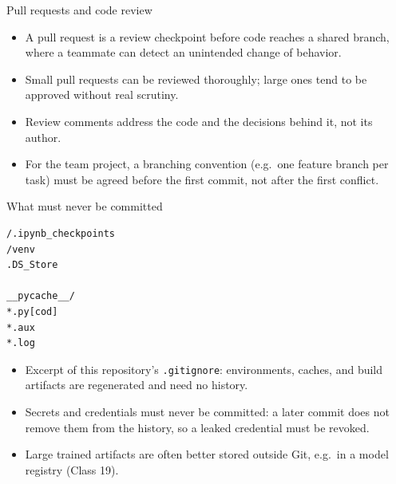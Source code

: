 \begin{frame}{Pull requests and code review}
\begin{itemize}
\item A pull request is a review checkpoint before code reaches a shared branch, where a teammate can detect an unintended change of behavior.
\item Small pull requests can be reviewed thoroughly; large ones tend to be approved without real scrutiny.
\item Review comments address the code and the decisions behind it, not its author.
\item For the team project, a branching convention (e.g.\ one feature branch per task) must be agreed before the first commit, not after the first conflict.
\end{itemize}
\coursefooter
\end{frame}

\begin{frame}[fragile]{What must never be committed}
\begin{lstlisting}[style=coursepython,language=bash]
/.ipynb_checkpoints
/venv
.DS_Store

__pycache__/
*.py[cod]
*.aux
*.log
\end{lstlisting}
\begin{itemize}
\item Excerpt of this repository's \texttt{.gitignore}: environments, caches, and build artifacts are regenerated and need no history.
\item Secrets and credentials must never be committed: a later commit does not remove them from the history, so a leaked credential must be revoked.
\item Large trained artifacts are often better stored outside Git, e.g.\ in a model registry (Class 19).
\end{itemize}
\coursefooter
\end{frame}

